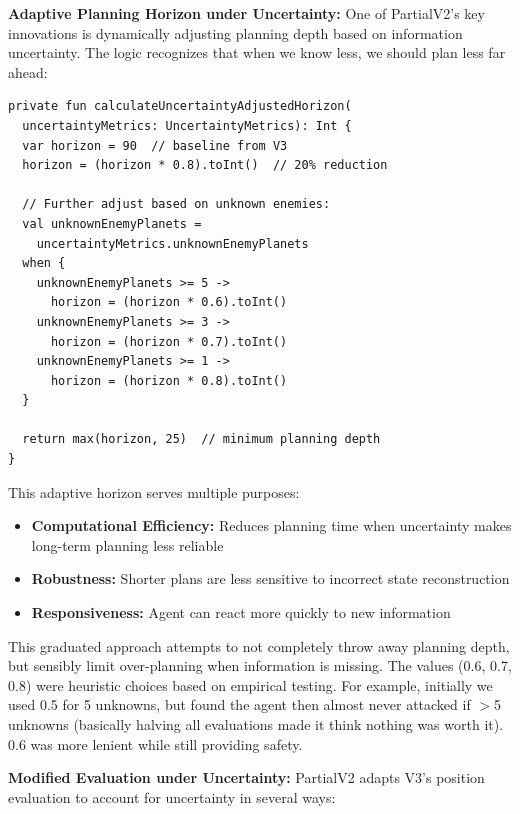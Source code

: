 \documentclass[conference]{IEEEtran}
\begin{document}
\textbf{Adaptive Planning Horizon under Uncertainty:} One of PartialV2's key innovations is dynamically adjusting planning depth based on information uncertainty. The logic recognizes that when we know less, we should plan less far ahead:

\begin{scriptsize}
\raggedright
\begin{verbatim}
private fun calculateUncertaintyAdjustedHorizon(
  uncertaintyMetrics: UncertaintyMetrics): Int {
  var horizon = 90  // baseline from V3
  horizon = (horizon * 0.8).toInt()  // 20% reduction
  
  // Further adjust based on unknown enemies:
  val unknownEnemyPlanets = 
    uncertaintyMetrics.unknownEnemyPlanets
  when {
    unknownEnemyPlanets >= 5 -> 
      horizon = (horizon * 0.6).toInt()
    unknownEnemyPlanets >= 3 -> 
      horizon = (horizon * 0.7).toInt()
    unknownEnemyPlanets >= 1 -> 
      horizon = (horizon * 0.8).toInt()
  }
  
  return max(horizon, 25)  // minimum planning depth
}
\end{verbatim}
\end{scriptsize}

This adaptive horizon serves multiple purposes:
\begin{itemize}
\item \textbf{Computational Efficiency:} Reduces planning time when uncertainty makes long-term planning less reliable
\item \textbf{Robustness:} Shorter plans are less sensitive to incorrect state reconstruction
\item \textbf{Responsiveness:} Agent can react more quickly to new information
\end{itemize}

This graduated approach attempts to not completely throw away planning depth, but sensibly limit over-planning when information is missing. The values (0.6, 0.7, 0.8) were heuristic choices based on empirical testing. For example, initially we used 0.5 for 5 unknowns, but found the agent then almost never attacked if $>$5 unknowns (basically halving all evaluations made it think nothing was worth it). 0.6 was more lenient while still providing safety.

\textbf{Modified Evaluation under Uncertainty:} PartialV2 adapts V3's position evaluation to account for uncertainty in several ways:
\end{document}

